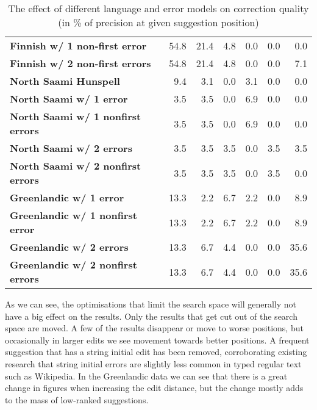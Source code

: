 \documentclass[a4paper,12pt]{article}
\begin{document}
\begin{table}
\begin{tabular}{|l|r|r|r|r|r|r|}
\bf Finnish w/ 1 non-first error & 54.8 & 21.4 & 4.8 & 0.0 & 0.0 & 0.0 \\
\bf Finnish w/ 2 non-first errors & 54.8 & 21.4 & 4.8 & 0.0 & 0.0 & 7.1 \\
        \hline
        \bf North Saami Hunspell & 9.4 & 3.1 & 0.0 & 3.1 & 0.0 & 0.0 \\
        \hline
        \bf North Saami w/ 1 error & 3.5 & 3.5 & 0.0 & 6.9 & 0.0 & 0.0 \\
        \bf North Saami w/ 1 nonfirst errors & 3.5 & 3.5 & 0.0 & 6.9 & 0.0 & 0.0\\
        \bf North Saami w/ 2 errors & 3.5 & 3.5 & 3.5 & 0.0 & 3.5 & 3.5 \\
        \bf North Saami w/ 2 nonfirst errors & 3.5 & 3.5 & 3.5 & 0.0 & 3.5 & 0.0\\
        \hline
          \bf Greenlandic w/ 1 error & 13.3 & 2.2 & 6.7 & 2.2 & 0.0 & 8.9 \\
 \bf Greenlandic w/ 1 nonfirst error & 13.3 & 2.2 & 6.7 & 2.2 & 0.0 & 8.9 \\
         \bf Greenlandic w/ 2 errors & 13.3 & 6.7 & 4.4 & 0.0 & 0.0 & 35.6 \\
\bf Greenlandic w/ 2 nonfirst errors & 13.3 & 6.7 & 4.4 & 0.0 & 0.0 & 35.6 \\
        \hline
    \end{tabular}
    \caption{The effect of different language and error models on correction
        quality (in \% of precision at given suggestion position)
    \label{table:quality}}
\end{table}

As we can see, the optimisations that limit the search space will generally not
have a big effect on the results. Only the results that get cut out of the
search space are moved. A few of the results disappear or move to worse
positions, but occasionally in larger edits we see movement towards better
positions.  A frequent suggestion that has a string initial edit has been
removed, corroborating existing research that string initial errors are
slightly less common in typed regular text such as Wikipedia.
In the Greenlandic data we can see that there is a great change in figures
when increasing the edit distance, but the change mostly adds to the mass of
low-ranked suggestions.



%
\end{document}
